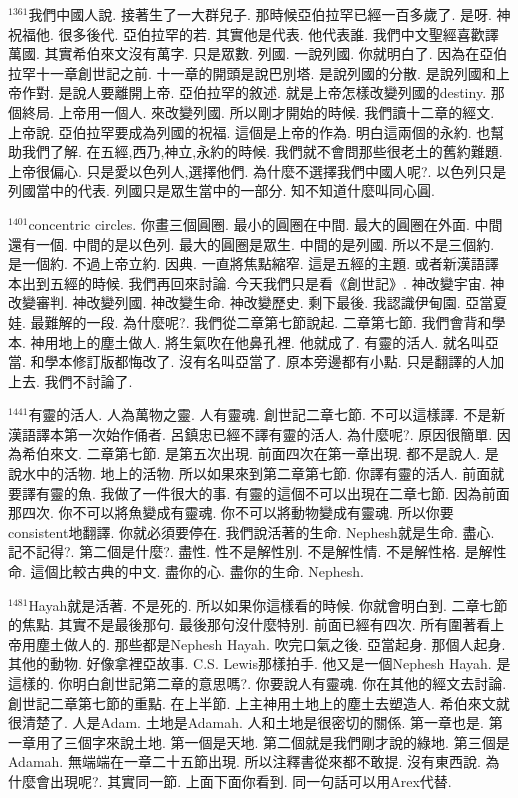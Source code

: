 \documentclass{book}
\begin{document}
$^{1361}$我們中國人說.
接著生了一大群兒子.
那時候亞伯拉罕已經一百多歲了.
是呀.
神祝福他.
很多後代.
亞伯拉罕的若.
其實他是代表.
他代表誰.
我們中文聖經喜歡譯萬國.
其實希伯來文沒有萬字.
只是眾數.
列國.
一說列國.
你就明白了.
因為在亞伯拉罕十一章創世記之前.
十一章的開頭是說巴別塔.
是說列國的分散.
是說列國和上帝作對.
是說人要離開上帝.
亞伯拉罕的敘述.
就是上帝怎樣改變列國的destiny.
那個終局.
上帝用一個人.
來改變列國.
所以剛才開始的時候.
我們讀十二章的經文.
上帝說.
亞伯拉罕要成為列國的祝福.
這個是上帝的作為.
明白這兩個的永約.
也幫助我們了解.
在五經,西乃,神立,永約的時候.
我們就不會問那些很老土的舊約難題.
上帝很偏心.
只是愛以色列人,選擇他們.
為什麼不選擇我們中國人呢?.
以色列只是列國當中的代表.
列國只是眾生當中的一部分.
知不知道什麼叫同心圓.

$^{1401}$concentric circles.
你畫三個圓圈.
最小的圓圈在中間.
最大的圓圈在外面.
中間還有一個.
中間的是以色列.
最大的圓圈是眾生.
中間的是列國.
所以不是三個約.
是一個約.
不過上帝立約.
因典.
一直將焦點縮窄.
這是五經的主題.
或者新漢語譯本出到五經的時候.
我們再回來討論.
今天我們只是看《創世記》.
神改變宇宙.
神改變審判.
神改變列國.
神改變生命.
神改變歷史.
剩下最後.
我認識伊甸園.
亞當夏娃.
最難解的一段.
為什麼呢?.
我們從二章第七節說起.
二章第七節.
我們會背和學本.
神用地上的塵土做人.
將生氣吹在他鼻孔裡.
他就成了.
有靈的活人.
就名叫亞當.
和學本修訂版都悔改了.
沒有名叫亞當了.
原本旁邊都有小點.
只是翻譯的人加上去.
我們不討論了.

$^{1441}$有靈的活人.
人為萬物之靈.
人有靈魂.
創世記二章七節.
不可以這樣譯.
不是新漢語譯本第一次始作俑者.
呂鎮忠已經不譯有靈的活人.
為什麼呢?.
原因很簡單.
因為希伯來文.
二章第七節.
是第五次出現.
前面四次在第一章出現.
都不是說人.
是說水中的活物.
地上的活物.
所以如果來到第二章第七節.
你譯有靈的活人.
前面就要譯有靈的魚.
我做了一件很大的事.
有靈的這個不可以出現在二章七節.
因為前面那四次.
你不可以將魚變成有靈魂.
你不可以將動物變成有靈魂.
所以你要consistent地翻譯.
你就必須要停在.
我們說活著的生命.
Nephesh就是生命.
盡心.
記不記得?.
第二個是什麼?.
盡性.
性不是解性別.
不是解性情.
不是解性格.
是解性命.
這個比較古典的中文.
盡你的心.
盡你的生命.
Nephesh.

$^{1481}$Hayah就是活著.
不是死的.
所以如果你這樣看的時候.
你就會明白到.
二章七節的焦點.
其實不是最後那句.
最後那句沒什麼特別.
前面已經有四次.
所有圍著看上帝用塵土做人的.
那些都是Nephesh Hayah.
吹完口氣之後.
亞當起身.
那個人起身.
其他的動物.
好像拿裡亞故事.
C.S. Lewis那樣拍手.
他又是一個Nephesh Hayah.
是這樣的.
你明白創世記第二章的意思嗎?.
你要說人有靈魂.
你在其他的經文去討論.
創世記二章第七節的重點.
在上半節.
上主神用土地上的塵土去塑造人.
希伯來文就很清楚了.
人是Adam.
土地是Adamah.
人和土地是很密切的關係.
第一章也是.
第一章用了三個字來說土地.
第一個是天地.
第二個就是我們剛才說的綠地.
第三個是Adamah.
無端端在一章二十五節出現.
所以注釋書從來都不敢提.
沒有東西說.
為什麼會出現呢?.
其實同一節.
上面下面你看到.
同一句話可以用Arex代替.
\end{document}
